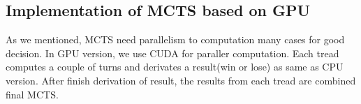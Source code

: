 \subsection{Implementation of MCTS based on GPU}
As we mentioned, MCTS need parallelism to computation many cases for good decision. 
In GPU version, we use CUDA for paraller computation. 
Each tread computes a couple of turns and derivates a result(win or lose) as same as CPU version. 
After finish derivation of result, the results from each tread are combined final MCTS. 
